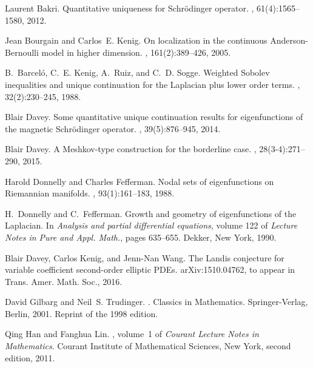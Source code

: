 \documentclass[11pt]{amsart}
\theoremstyle{plain}
\numberwithin{equation}{section}
\begin{document}
\begin{thebibliography}{BKRS88}

Laurent Bakri.
\newblock Quantitative uniqueness for {S}chr{\"o}dinger operator.
, 61(4):1565--1580, 2012.

Jean Bourgain and Carlos~E. Kenig.
\newblock On localization in the continuous {A}nderson-{B}ernoulli model in
  higher dimension.
, 161(2):389--426, 2005.

B.~Barcel\'o, C.~E. Kenig, A.~Ruiz, and C.~D. Sogge.
\newblock Weighted {S}obolev inequalities and unique continuation for the
  {L}aplacian plus lower order terms.
, 32(2):230--245, 1988.

Blair Davey.
\newblock Some quantitative unique continuation results for eigenfunctions of
  the magnetic {S}chr\"odinger operator.
, 39(5):876--945, 2014.

Blair Davey.
\newblock A {M}eshkov-type construction for the borderline case.
, 28(3-4):271--290, 2015.

Harold Donnelly and Charles Fefferman.
\newblock Nodal sets of eigenfunctions on {R}iemannian manifolds.
, 93(1):161--183, 1988.

H.~Donnelly and C.~Fefferman.
\newblock Growth and geometry of eigenfunctions of the {L}aplacian.
\newblock In {\em Analysis and partial differential equations}, volume 122 of
  {\em Lecture Notes in Pure and Appl. Math.}, pages 635--655. Dekker, New
  York, 1990.

Blair Davey, Carlos Kenig, and Jenn-Nan Wang.
\newblock The {L}andis conjecture for variable coefficient second-order
  elliptic {PDE}s.
\newblock arXiv:1510.04762, to appear in Trans. Amer. Math. Soc., 2016.

David Gilbarg and Neil~S. Trudinger.
.
\newblock Classics in Mathematics. Springer-Verlag, Berlin, 2001.
\newblock Reprint of the 1998 edition.

Qing Han and Fanghua Lin.
, volume~1 of {\em
  Courant Lecture Notes in Mathematics}.
\newblock Courant Institute of Mathematical Sciences, New York, second edition,
  2011.


\end{thebibliography}
\end{document}
